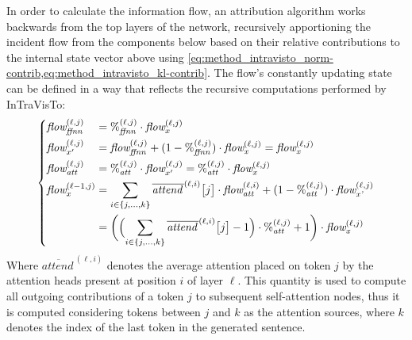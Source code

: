 In order to calculate the information flow, an attribution algorithm works backwards from the top layers of the network, recursively apportioning the incident flow from the components below based on their relative contributions to the internal state vector above using \cref{eq:method_intravisto_norm-contrib,eq:method_intravisto_kl-contrib}.
The flow's constantly updating state can be defined in a way that reflects the recursive computations performed by InTraVisTo:
\begin{equation}
    \label{eq:method_intravisto_flows}
    \left\{
    \begin{alignedat}{2}
        &\textit{flow}_{\textit{ffnn}}^{(\ell,j)} &&= {\%}_{\textit{ffnn}}^{(\ell,j)} \cdot \textit{flow}_{x}^{(\ell,j)} \\
        &\textit{flow}_{x'}^{(\ell,j)} &&= \textit{flow}_{\textit{ffnn}}^{(\ell,j)} + (1 - {\%}_{\textit{ffnn}}^{(\ell,j)}) \cdot \textit{flow}_{\textit{x}}^{(\ell,j)} = \textit{flow}_{\textit{x}}^{(\ell,j)} \\
        &\textit{flow}_{\textit{att}}^{(\ell,j)} &&= {\%}_{\textit{att}}^{(\ell,j)} \cdot \textit{flow}_{x'}^{(\ell,j)} = {\%}_{\textit{att}}^{(\ell,j)} \cdot \textit{flow}_{x}^{(\ell,j)} \\
        &\textit{flow}_{x}^{(\ell-1,j)} &&= \sum_{i\in\{j,\ldots,k\}}{\overline{\textit{attend}{\,}}^{(\ell,i)}\bigl[j\bigr]}\cdot\textit{flow}_{\textit{att}}^{(\ell,i)} + ( 1 - {\%}_{\textit{att}}^{(\ell,j)})\cdot \textit{flow}_{\textit{x'}}^{(\ell,j)} \\
            &\quad &&= \biggl(\Bigl(\sum_{i\in\{j,\ldots,k\}}\overline{\textit{attend}{\,}}^{(\ell,i)}\bigl[j\bigr] - 1\Bigr)\cdot{\%}_{\textit{att}}^{(\ell,j)} + 1\biggr) \cdot \textit{flow}_{\textit{x}}^{(\ell,j)}
    \end{alignedat}
    \right.
\end{equation}
Where $\overline{\textit{attend}{\,}}^{(\ell,i)}$ denotes the average attention placed on token $j$ by the attention heads present at position $i$ of layer $\ell$.
This quantity is used to compute all outgoing contributions of a token $j$ to subsequent self-attention nodes, thus it is computed considering tokens between $j$ and $k$ as the attention sources, where $k$ denotes the index of the last token in the generated sentence.

